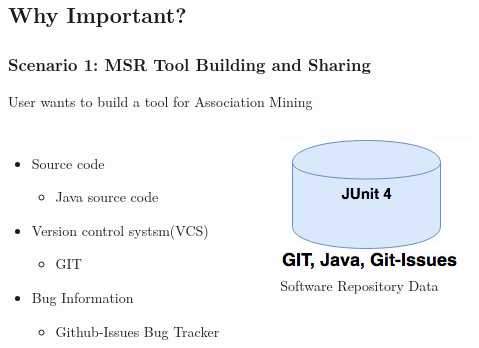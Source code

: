         \subsection{Why Important?}
        \begin{frame}
            \frametitle{Scenario 1: MSR Tool Building and Sharing}
        User wants to build a tool for Association Mining
            \begin{columns}
                    \begin{itemize}
                      \item Source code
                          \begin{itemize}
                            \item Java source code
                          \end{itemize}
                      \item Version control systsm(VCS)
                          \begin{itemize}
                            \item GIT
                          \end{itemize}
                      \item Bug Information
                          \begin{itemize}
                            \item Github-Issues Bug Tracker
                          \end{itemize}
                    \end{itemize}

                    \begin{figure}
                    \centering
                    \includegraphics[width=0.60\linewidth]{figures/junit4.jpg}
                    \caption{\tiny{Software Repository Data}}
                    \end{figure}

            \end{columns}
        \end{frame}

